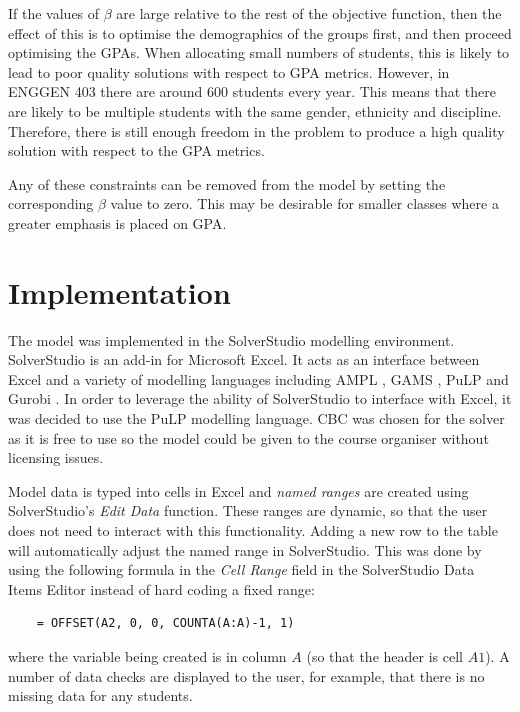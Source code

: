 \documentclass[12pt]{ORSNZ}
\begin{document}
If the values of $\beta$ are large relative to the rest of the objective function, then the effect of this is to optimise the demographics of the groups first, and then proceed optimising the GPAs. When allocating small numbers of students, this is likely to lead to poor quality solutions with respect to GPA metrics. However, in ENGGEN 403 there are around 600 students every year. This means that there are likely to be multiple students with the same gender, ethnicity and discipline. Therefore, there is still enough freedom in the problem to produce a high quality solution with respect to the GPA metrics.

Any of these constraints can be removed from the model by setting the corresponding $\beta$ value to zero. This may be desirable for smaller classes where a greater emphasis is placed on GPA.
\section{Implementation}

The model was implemented in the SolverStudio \cite{solverstudio} modelling environment. SolverStudio is an add-in for Microsoft Excel. It acts as an interface between Excel and a variety of modelling languages including AMPL \cite{ampl}, GAMS \cite{gams}, PuLP \cite{pulp} and Gurobi \cite{gurobi}. In order to leverage the ability of SolverStudio to interface with Excel, it was decided to use the PuLP modelling language. CBC \cite{CBC} was chosen for the solver as it is free to use so the model could be given to the course organiser without licensing issues.

Model data is typed into cells in Excel and \emph{named ranges} are created using SolverStudio's \emph{Edit Data} function. These ranges are dynamic, so that the user does not need to interact with this functionality. Adding a new row to the table will automatically adjust the named range in SolverStudio. This was done by using the following formula in the \emph{Cell Range} field in the SolverStudio Data Items Editor instead of hard coding a fixed range:

\begin{verbatim}
    = OFFSET(A2, 0, 0, COUNTA(A:A)-1, 1)
\end{verbatim}

where the variable being created is in column $A$ (so that the header is cell $A1$). A number of data checks are displayed to the user, for example, that there is no missing data for any students.
\end{document}
